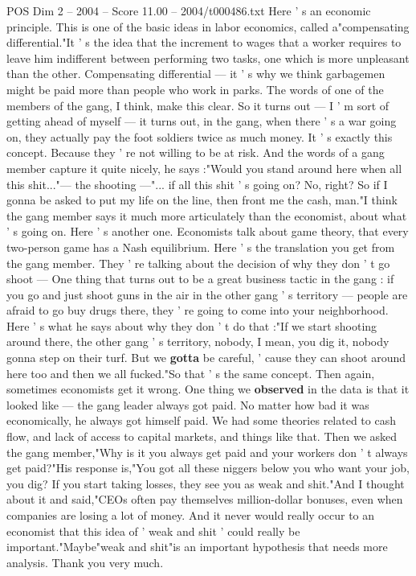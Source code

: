 \begin{textsample}{POS Dim 2 – 2004 – Score 11.00 – 2004/t000486.txt}
Here ' s an economic principle.
This is one of the basic ideas in labor economics, called a"compensating differential."It ' s the idea that the increment to wages that a worker requires to leave him indifferent between performing two tasks, one which is more unpleasant than the other.
Compensating differential — it ' s why we think garbagemen might be paid more than people who work in parks.
The words of one of the members of the gang, I think, make this clear.
So it turns out — I ' m sort of getting ahead of myself — it turns out, in the gang, when there ' s a war going on, they actually pay the foot soldiers twice as much money.
It ' s exactly this concept.
Because they ' re not willing to be at risk.
And the words of a gang member capture it quite nicely, he says :"Would you stand around here when all this shit..."— the shooting —"... if all this shit ' s going on?
No, right?
So if I gonna be asked to put my life on the line, then front me the cash, man."I think the gang member says it much more articulately than the economist, about what ' s going on.
Here ' s another one.
Economists talk about game theory, that every two-person game has a Nash equilibrium.
Here ' s the translation you get from the gang member.
They ' re talking about the decision of why they don ' t go shoot — One thing that turns out to be a great business tactic in the gang : if you go and just shoot guns in the air in the other gang ' s territory — people are afraid to go buy drugs there, they ' re going to come into your neighborhood.
Here ' s what he says about why they don ' t do that :"If we start shooting around there, the other gang ' s territory, nobody, I mean, you dig it, nobody gonna step on their turf.
But we \textbf{gotta} be careful, ' cause they can shoot around here too and then we all fucked."So that ' s the same concept.
Then again, sometimes economists get it wrong.
One thing we \textbf{observed} in the data is that it looked like — the gang leader always got paid.
No matter how bad it was economically, he always got himself paid.
We had some theories related to cash flow, and lack of access to capital markets, and things like that.
Then we asked the gang member,"Why is it you always get paid and your workers don ' t always get paid?"His response is,"You got all these niggers below you who want your job, you dig?
If you start taking losses, they see you as weak and shit."And I thought about it and said,"CEOs often pay themselves million-dollar bonuses, even when companies are losing a lot of money.
And it never would really occur to an economist that this idea of ' weak and shit ' could really be important."Maybe"weak and shit"is an important hypothesis that needs more analysis.
Thank you very much.

\end{textsample}
